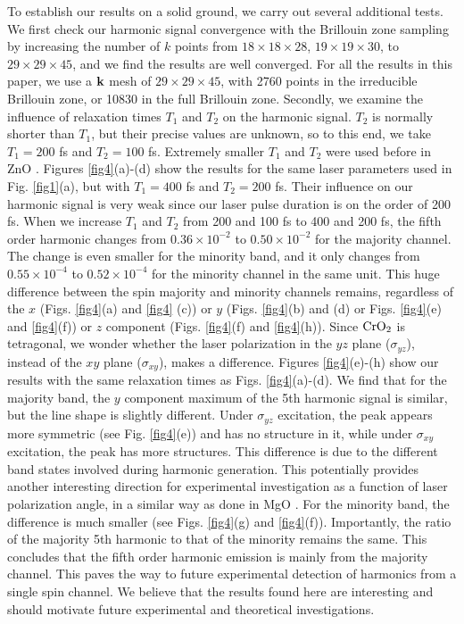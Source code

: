 \documentclass[checkin,showpacs,psfig,aps,pra]{revtex4}
\newcommand{\Cr}{$\rm CrO_{2}$ }
\newcommand{\clr}{}
\begin{document}
{To establish our results on a solid ground, we carry out several
  additional tests.  We first check our harmonic signal convergence
  with the Brillouin zone sampling by increasing the number of $k$
  points from $18\times 18 \times 28$, $19\times 19 \times 30$, to
  $29\times 29 \times 45$, and we find the results are well converged.
  For all the results in this paper, we use a ${\bf k}$ mesh of
  $29\times 29 \times 45$, with 2760 points in the irreducible
  Brillouin zone, or 10830 in the full Brillouin zone.  Secondly, we
  examine the influence of relaxation times $T_1$ and $T_2$ on the
  harmonic signal.  $T_2$ is normally shorter than $T_1$, but their
  precise values are unknown, so to this end, we take $T_1=200$ fs and
  $T_2=100$ fs.  {\clr Extremely smaller $T_1$ and $T_2$ were used
    before in ZnO \cite{vampa2014}.}  Figures \ref{fig4}(a)-(d) show
  the results for the same laser parameters used in
  Fig. \ref{fig1}(a), but with $T_1=400$ fs and $T_2=200$ fs.  Their
  influence on our harmonic signal is very weak since our laser pulse
  duration is on the order of 200 fs.  When we increase $T_1$ and
  $T_2$ from 200 and 100 fs to 400 and 200 fs, the fifth order
  harmonic changes from $0.36\times 10^{-2}$ to $0.50\times 10^{-2}$
  for the majority channel.  The change is even smaller for the
  minority band, and it only changes from $0.55\times 10^{-4}$ to
  $0.52\times 10^{-4}$ for the minority channel in the same unit. This
  huge difference between the spin majority and minority channels
  remains, regardless of the $x$ (Figs.  \ref{fig4}(a) and \ref{fig4}
  (c)) or $y$ (Figs. \ref{fig4}(b) and (d) or Figs. \ref{fig4}(e) and
  \ref{fig4}(f)) or $z$ component (Figs. \ref{fig4}(f) and
  \ref{fig4}(h)).  Since \Cr is tetragonal, we wonder whether the
  laser polarization in the $yz$ plane ($\sigma_{yz}$), instead of the
  $xy$ plane ($\sigma_{xy}$), makes a difference. Figures
  \ref{fig4}(e)-(h) show our results with the same relaxation times as
  Figs.  \ref{fig4}(a)-(d).  We find that for the majority band, the
  $y$ component maximum of the 5th harmonic signal is similar, but the
  line shape is slightly different. Under $\sigma_{yz}$ excitation,
  the peak appears more symmetric (see Fig. \ref{fig4}(e)) and has no
  structure in it, while under $\sigma_{xy}$ excitation, the peak has
  more structures. This difference is due to the different band states
  involved during harmonic generation. This potentially provides
  another interesting direction for experimental investigation as a
  function of laser polarization angle, in a similar way as done in
  MgO \cite{you2017}. For the minority band, the difference is much
  smaller (see Figs. \ref{fig4}(g) and \ref{fig4}(f)). Importantly,
  the ratio of the majority 5th harmonic to that of the minority
  remains the same.}  This concludes that the fifth order harmonic
emission is mainly from the majority channel.  This paves the way to
future experimental detection of harmonics from a single spin channel.
We believe that the results found here are interesting and should
motivate future experimental and theoretical investigations.
\end{document}
